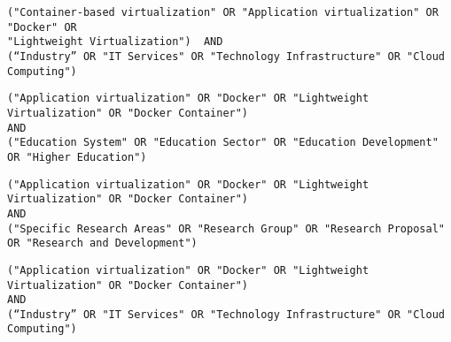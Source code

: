 \begin{tcolorbox}[
  colback=gray!5, 
  colframe=black!60, 
  title=Cadena de búsqueda en Science Direct para industria, 
  fonttitle=\bfseries, 
  sharp corners=south
]
\scriptsize %
\begin{verbatim}
("Container-based virtualization" OR "Application virtualization" OR "Docker" OR 
"Lightweight Virtualization")  AND 
(“Industry” OR "IT Services" OR "Technology Infrastructure" OR "Cloud Computing")
\end{verbatim}
\end{tcolorbox}

\begin{tcolorbox}[
  colback=gray!5, 
  colframe=black!60, 
  title=Cadena de búsqueda en Taylor \& Francis para educación, 
  fonttitle=\bfseries, 
  sharp corners=south
]
\scriptsize %
\begin{verbatim}
("Application virtualization" OR "Docker" OR "Lightweight Virtualization" OR "Docker Container")   
AND   
("Education System" OR "Education Sector" OR "Education Development" OR "Higher Education")
\end{verbatim}
\end{tcolorbox}

\begin{tcolorbox}[
  colback=gray!5, 
  colframe=black!60, 
  title=Cadena de búsqueda en Taylor \& Francis para investigación, 
  fonttitle=\bfseries, 
  sharp corners=south
]
\scriptsize %
\begin{verbatim}
("Application virtualization" OR "Docker" OR "Lightweight Virtualization" OR "Docker Container")
AND   
("Specific Research Areas" OR "Research Group" OR "Research Proposal" OR "Research and Development")
\end{verbatim}
\end{tcolorbox}

\begin{tcolorbox}[
  colback=gray!5, 
  colframe=black!60, 
  title=Cadena de búsqueda en Taylor \& Francis para industria, 
  fonttitle=\bfseries, 
  sharp corners=south
]
\scriptsize %
\begin{verbatim}
("Application virtualization" OR "Docker" OR "Lightweight Virtualization" OR "Docker Container")  
AND 
(“Industry” OR "IT Services" OR "Technology Infrastructure" OR "Cloud Computing")
\end{verbatim}
\end{tcolorbox}

